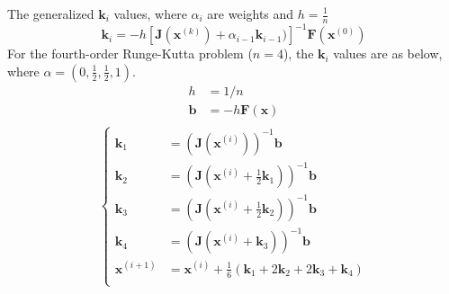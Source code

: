 \documentclass[8pt]{article}
\begin{document}
\begin{multicols}{2}
\begin{description}
    The generalized $\mathbf{k}_i$ values, where $\alpha_i$ are weights and $h=\frac{1}{n}$
    $$ \mathbf{k}_i = -h[\mathbf{J}(\mathbf{x}^{(k)})+\alpha_{i-1}\mathbf{k}_{i-1})]^{-1}\mathbf{F}(\mathbf{x}^{(0)}) $$
    For the fourth-order Runge-Kutta problem ($n=4$), the $\mathbf{k}_i$ values are as below,
    where $\alpha = (0, \frac{1}{2}, \frac{1}{2}, 1)$.
    \begin{equation*}
      \begin{aligned}
        h &= 1/n \\
        \mathbf{b} &=-h\mathbf{F}(\mathbf{x}) \\
      \end{aligned}
    \end{equation*}
    \begin{equation*}
      \left\{
        \begin{aligned}
          \mathbf{k}_1 &= (\mathbf{J}(\mathbf{x}^{(i)}))^{-1}\mathbf{b} \\
          \mathbf{k}_2 &= (\mathbf{J}(\mathbf{x}^{(i)}+\frac{1}{2}\mathbf{k}_1))^{-1}\mathbf{b} \\
          \mathbf{k}_3 &= (\mathbf{J}(\mathbf{x}^{(i)}+\frac{1}{2}\mathbf{k}_2))^{-1}\mathbf{b} \\
          \mathbf{k}_4 &= (\mathbf{J}(\mathbf{x}^{(i)}+\mathbf{k}_3))^{-1}\mathbf{b} \\
          \mathbf{x}^{(i+1)} &= \mathbf{x}^{(i)} + \frac{1}{6}(\mathbf{k}_1+2\mathbf{k}_2+2\mathbf{k}_3+\mathbf{k}_4) \\
        \end{aligned}
      \right.
    \end{equation*}
  \end{description}
\end{multicols}
\end{document}
